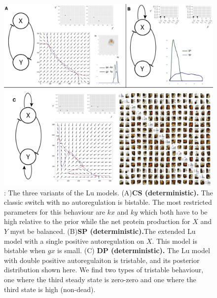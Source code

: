 \begin{figure}[p]
\begin{center}
\includegraphics[width=\textwidth]{chapterStabilityFinder/images/figure-03.png}
\caption[LoF caption]{ \label{fig:fig3}: The three variants of the Lu models. (A)\textbf{CS (deterministic).}  The classic switch with no autoregulation is bistable. The most restricted parameters for this behaviour are $kx$ and $ky$ which both have to be high relative to the prior while the net protein production for $X$ and $Y$ myst be balanced. (B)\textbf{SP (deterministic).}The extended Lu model with a single positive autoregulation on $X$. This model is bistable when $gx$ is small. (C) \textbf{DP (deterministic).} The Lu model with double positive autoregulaiton is tristable, and its posterior distribution shown here. We find two types of tristable behaviour, one where the third steady state is zero-zero and one where the third state is high (non-dead).}
\end{center}
\end{figure}
\clearpage

